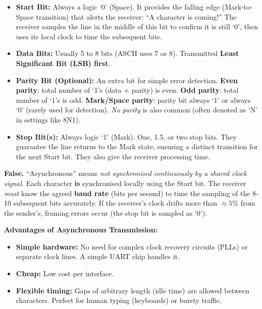 \documentclass[11pt]{article}
\begin{document}
\begin{definition}
\begin{itemize}
    \item \textbf{Start Bit:} Always a logic `0' (Space). It provides the falling edge (Mark-to-Space transition) that alerts the receiver: ``A character is coming!'' The receiver samples the line in the middle of this bit to confirm it is still `0', then uses its local clock to time the subsequent bits.
    \item \textbf{Data Bits:} Usually 5 to 8 bits (ASCII uses 7 or 8). Transmitted \textbf{Least Significant Bit (LSB) first}.
    \item \textbf{Parity Bit (Optional):} An extra bit for simple error detection. \textbf{Even parity}: total number of `1's (data + parity) is even. \textbf{Odd parity}: total number of `1's is odd. \textbf{Mark/Space parity}: parity bit always `1' or always `0' (rarely used for detection). \emph{No parity} is also common (often denoted as `N' in settings like 8N1).
    \item \textbf{Stop Bit(s):} Always logic `1' (Mark). One, 1.5, or two stop bits. They guarantee the line returns to the Mark state, ensuring a distinct transition for the next Start bit. They also give the receiver processing time.
\end{itemize}
\end{definition}

\begin{attention}
\textbf{False.} ``Asynchronous'' means \emph{not synchronised continuously by a shared clock signal}. Each character \textbf{is} synchronised locally using the Start bit. The receiver \emph{must} know the agreed \textbf{baud rate} (bits per second) to time the sampling of the 8-10 subsequent bits accurately. If the receiver's clock drifts more than $\approx 5\%$ from the sender's, framing errors occur (the stop bit is sampled as `0').
\end{attention}

\textbf{Advantages of Asynchronous Transmission:}
\begin{itemize}
    \item \textbf{Simple hardware:} No need for complex clock recovery circuits (PLLs) or separate clock lines. A simple UART chip handles it.
    \item \textbf{Cheap:} Low cost per interface.
    \item \textbf{Flexible timing:} Gaps of arbitrary length (idle time) are allowed between characters. Perfect for human typing (keyboards) or bursty traffic.
\end{itemize}
\end{document}
